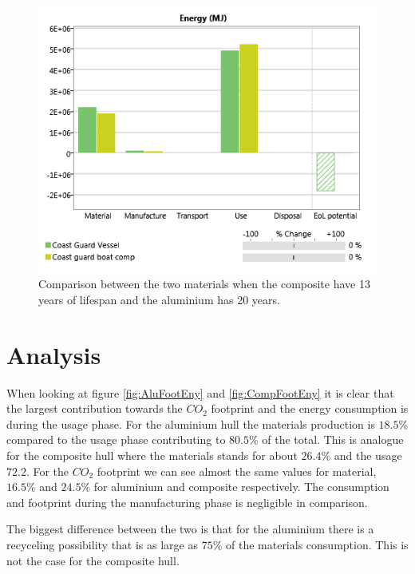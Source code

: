 \documentclass[12pt,a4paper]{article}
\begin{document}
\begin{center}
    \begin{figure}[H]
      \centering
      \includegraphics[scale=0.5]{comp1320.png}
      \caption{Comparison between the two materials when the composite
      have 13 years of lifespan and the aluminium has 20 years.}
      \label{fig:comp1320}
    \end{figure}
\end{center}


\section{Analysis}
  When looking at figure \ref{fig:AluFootEny} and \ref{fig:CompFootEny}
  it is clear that the largest contribution towards the $CO_2$ footprint
  and the energy consumption is during the usage phase. For the
  aluminium hull the materials production is $18.5\%$ compared to the
  usage phase contributing to $80.5\%$ of the total. This is analogue
  for the composite hull where the materials stands for about $26.4\%$
  and the usage $72.2$. For the $CO_2$ footprint we can see almost the
  same values for material, $16.5\%$ and $24.5\%$ for aluminium and
  composite respectively. The consumption and footprint during the
  manufacturing phase is negligible in comparison.

  The biggest difference between the two is that for the aluminium there
  is a recyceling possibility that is as large as $75\%$ of the
  materials consumption. This is not the case for the composite hull.
\end{document}
